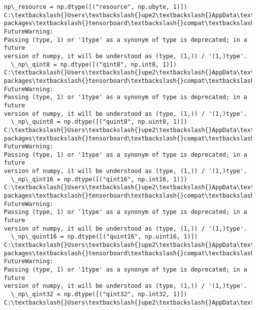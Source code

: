 \documentclass[11pt]{article}
\begin{document}
\begin{Verbatim}[commandchars=\\\{\}]
  np\_resource = np.dtype([("resource", np.ubyte, 1)])
C:\textbackslash{}Users\textbackslash{}upe2\textbackslash{}AppData\textbackslash{}Roaming\textbackslash{}Python\textbackslash{}Python36\textbackslash{}site-
packages\textbackslash{}tensorboard\textbackslash{}compat\textbackslash{}tensorflow\_stub\textbackslash{}dtypes.py:541: FutureWarning:
Passing (type, 1) or '1type' as a synonym of type is deprecated; in a future
version of numpy, it will be understood as (type, (1,)) / '(1,)type'.
  \_np\_qint8 = np.dtype([("qint8", np.int8, 1)])
C:\textbackslash{}Users\textbackslash{}upe2\textbackslash{}AppData\textbackslash{}Roaming\textbackslash{}Python\textbackslash{}Python36\textbackslash{}site-
packages\textbackslash{}tensorboard\textbackslash{}compat\textbackslash{}tensorflow\_stub\textbackslash{}dtypes.py:542: FutureWarning:
Passing (type, 1) or '1type' as a synonym of type is deprecated; in a future
version of numpy, it will be understood as (type, (1,)) / '(1,)type'.
  \_np\_quint8 = np.dtype([("quint8", np.uint8, 1)])
C:\textbackslash{}Users\textbackslash{}upe2\textbackslash{}AppData\textbackslash{}Roaming\textbackslash{}Python\textbackslash{}Python36\textbackslash{}site-
packages\textbackslash{}tensorboard\textbackslash{}compat\textbackslash{}tensorflow\_stub\textbackslash{}dtypes.py:543: FutureWarning:
Passing (type, 1) or '1type' as a synonym of type is deprecated; in a future
version of numpy, it will be understood as (type, (1,)) / '(1,)type'.
  \_np\_qint16 = np.dtype([("qint16", np.int16, 1)])
C:\textbackslash{}Users\textbackslash{}upe2\textbackslash{}AppData\textbackslash{}Roaming\textbackslash{}Python\textbackslash{}Python36\textbackslash{}site-
packages\textbackslash{}tensorboard\textbackslash{}compat\textbackslash{}tensorflow\_stub\textbackslash{}dtypes.py:544: FutureWarning:
Passing (type, 1) or '1type' as a synonym of type is deprecated; in a future
version of numpy, it will be understood as (type, (1,)) / '(1,)type'.
  \_np\_quint16 = np.dtype([("quint16", np.uint16, 1)])
C:\textbackslash{}Users\textbackslash{}upe2\textbackslash{}AppData\textbackslash{}Roaming\textbackslash{}Python\textbackslash{}Python36\textbackslash{}site-
packages\textbackslash{}tensorboard\textbackslash{}compat\textbackslash{}tensorflow\_stub\textbackslash{}dtypes.py:545: FutureWarning:
Passing (type, 1) or '1type' as a synonym of type is deprecated; in a future
version of numpy, it will be understood as (type, (1,)) / '(1,)type'.
  \_np\_qint32 = np.dtype([("qint32", np.int32, 1)])
C:\textbackslash{}Users\textbackslash{}upe2\textbackslash{}AppData\textbackslash{}Roaming\textbackslash{}Python\textbackslash{}Python36\textbackslash{}site-

\end{Verbatim}
\end{document}

